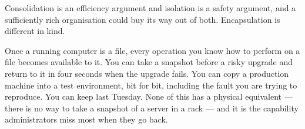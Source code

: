\begin{conceptbox}
Consolidation is an efficiency argument and isolation is a safety argument, and
a sufficiently rich organisation could buy its way out of both. Encapsulation is
different in kind.

\smallskip
Once a running computer is a file, every operation you know how to perform on a
file becomes available to it. You can take a snapshot before a risky upgrade and
return to it in four seconds when the upgrade fails. You can copy a production
machine into a test environment, bit for bit, including the fault you are trying
to reproduce. You can keep last Tuesday. None of this has a physical equivalent
--- there is no way to take a snapshot of a server in a rack --- and it is the
capability administrators miss most when they go back.
\end{conceptbox}

